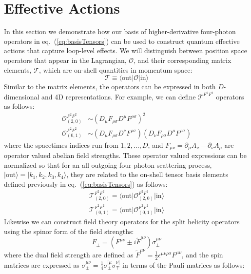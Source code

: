 \documentclass[11pt,letter]{article}
\def\eqn#1{eq.~(\ref{#1})}
\begin{document}
\section{Effective Actions} \label{sec:Actions}
In this section we demonstrate how our basis of higher-derivative four-photon operators in \eqn{eq:basisTensors} can be used to construct quantum effective actions that capture loop-level effects. We will distinguish between position space operators that appear in the Lagrangian, $\mathcal{O}$, and their corresponding matrix elements, $\mathcal{T}$, which are on-shell quantities in momentum space:
\begin{equation}\label{eq:OpsVsTens}
\mathcal{T} \equiv \langle \text{out}| \mathcal{O}|\text{in}\rangle
\end{equation}
Similar to the matrix elements, the operators can be expressed in both $D$-dimensional and 4D representations. For example, we can define $\mathcal{T}^{F^2F^2}$ operators as follows:
\begin{align}
\mathcal{O}^{F^2F^2}_{(2,0)} &\sim (D_\mu F_{\rho\sigma}D^\mu F^{\rho\sigma})^2
\\
\mathcal{O}^{F^2F^2}_{(0,1)} &\sim (D_\mu F_{\rho\sigma}D^\nu F^{\rho\sigma})(D_\nu F_{\rho\sigma}D^\mu F^{\rho\sigma})
\end{align}
where the spacetimes indices run from $1,2,...,D$, and $F_{\mu\nu} = \partial_\mu A_\nu - \partial_\nu A_\mu$ are operator valued abelian field strengths. These operator valued expressions can be normalized so that for an all outgoing four-photon scattering process, $|\text{out}\rangle = |k_1,k_2,k_3,k_4\rangle$, they are related to the on-shell tensor basis elements defined previously in \eqn{eq:basisTensors} as follows:
\begin{align}
\mathcal{T}^{F^2F^2}_{(2,0)} =\langle \text{out}\big|\mathcal{O}^{F^2F^2}_{(2,0)} \big|\text{in}\rangle
\\
\mathcal{T}^{F^2F^2}_{(0,1)} =\langle \text{out} \big|\mathcal{O}^{F^2F^2}_{(0,1)}\big |\text{in}\rangle
\end{align}
Likewise we can construct field theory operators for the split helicity operators using the spinor form of the field strengths:
\begin{equation}
F_\pm = (F^{\mu\nu} \pm i \tilde{F}^{\mu\nu})\sigma^{\mu\nu}_\pm
\end{equation}
where the dual field strength are defined as $\tilde{F}^{\mu\nu}= \frac{1}{2}\epsilon^{\mu\nu\rho\sigma}F^{\mu\nu}$, and the spin matrices are expressed as $\sigma^{\mu\nu}_\pm = \frac{1}{4} \sigma^{[\mu}_\pm \sigma^{\nu]}_\mp$ in terms of the Pauli matrices as follows:
\end{document}
